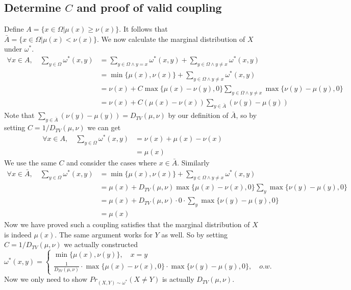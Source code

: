 \documentclass[12pt,letterpaper]{article}
\begin{document}
\subsection{Determine $C$ and proof of valid coupling}
Define $A=\{x\in\Omega|\mu(x)\geq\nu(x)\}$. It follows that $\bar{A}=\{x\in\Omega|\mu(x)<\nu(x)\}$. We now calculate the marginal distribution of $X$ under $\omega^*$.\\
\begin{align}
  \forall x\in A,\quad \sum_{y\in\Omega}\omega^*(x,y)&=\sum_{y\in\Omega\wedge y=x}\omega^*(x,y)+\sum_{y\in\Omega\wedge y\neq x}\omega^*(x,y)\\
  &=\min\{\mu(x),\nu(x)\}+\sum_{y\in\Omega\wedge y\neq x}\omega^*(x,y)\\
  &=\nu(x)+C\max\{\mu(x)-\nu(y),0\}\sum_{y\in\Omega\wedge y\neq x}\max\{\nu(y)-\mu(y),0\}\\
  &=\nu(x)+C(\mu(x)-\nu(x))\sum_{y\in\bar{A}}(\nu(y)-\mu(y))
\end{align}
Note that $\sum_{y\in\bar{A}}(\nu(y)-\mu(y))=D_{TV}(\mu,\nu)$ by our definition of $\bar{A}$, so by setting $C=1/D_{TV}(\mu,\nu)$ we can get 
\begin{align}
  \forall x\in A,\quad \sum_{y\in\Omega}\omega^*(x,y)&=\nu(x)+\mu(x)-\nu(x)\\
  &=\mu(x)
\end{align}
We use the same $C$ and consider the cases where $x\in\bar{A}$. Similarly
\begin{align}
  \forall x\in \bar{A},\quad \sum_{y\in\Omega}\omega^*(x,y)&=\min\{\mu(x),\nu(x)\}+\sum_{y\in\Omega\wedge y\neq x}\omega^*(x,y)\\
  &=\mu(x)+D_{TV}(\mu,\nu)\max\{\mu(x)-\nu(x),0\}\sum_{y}\max\{\nu(y)-\mu(y),0\}\\
  &=\mu(x)+D_{TV}(\mu,\nu)\cdot 0\cdot\sum_{y}\max\{\nu(y)-\mu(y),0\}\\
  &=\mu(x)
\end{align}
Now we have proved such a coupling satisfies that the marginal distribution of $X$ is indeed $\mu(x)$. The same argument works for $Y$ as well. So by setting $C=1/D_{TV}(\mu,\nu)$ we actually constructed 
$$\omega^*(x,y)=\begin{cases}
  \min\{\mu(x),\nu(y)\},\quad x=y\\
  \frac{1}{D_{TV}(\mu,\nu)}\cdot\max\{\mu(x)-\nu(x),0\}\cdot\max\{\nu(y)-\mu(y),0\},\quad o.w.
  \end{cases}$$
Now we only need to show $Pr_{(X,Y)\sim\omega^*}(X\neq Y)$ is actually $D_{TV}(\mu,\nu)$.
\end{document}
